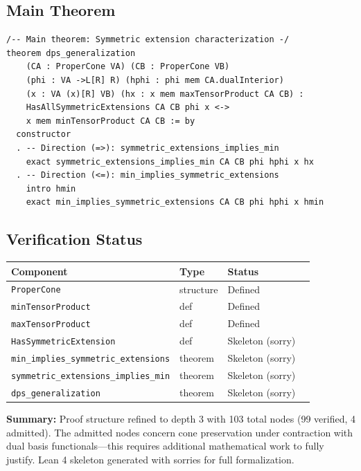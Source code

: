 \documentclass[11pt,a4paper]{article}
\theoremstyle{definition}
\theoremstyle{plain}
\begin{document}
\subsection{Main Theorem}

\begin{lstlisting}[firstnumber=85]
/-- Main theorem: Symmetric extension characterization -/
theorem dps_generalization
    (CA : ProperCone VA) (CB : ProperCone VB)
    (phi : VA ->L[R] R) (hphi : phi mem CA.dualInterior)
    (x : VA (x)[R] VB) (hx : x mem maxTensorProduct CA CB) :
    HasAllSymmetricExtensions CA CB phi x <->
    x mem minTensorProduct CA CB := by
  constructor
  . -- Direction (=>): symmetric_extensions_implies_min
    exact symmetric_extensions_implies_min CA CB phi hphi x hx
  . -- Direction (<=): min_implies_symmetric_extensions
    intro hmin
    exact min_implies_symmetric_extensions CA CB phi hphi x hmin
\end{lstlisting}

\subsection{Verification Status}

\begin{center}
\begin{tabular}{llll}
\toprule
\textbf{Component} & \textbf{Type} & \textbf{Status} \\
\midrule
\texttt{ProperCone} & structure & Defined \\
\texttt{minTensorProduct} & def & Defined \\
\texttt{maxTensorProduct} & def & Defined \\
\texttt{HasSymmetricExtension} & def & Skeleton (sorry) \\
\texttt{min\_implies\_symmetric\_extensions} & theorem & Skeleton (sorry) \\
\texttt{symmetric\_extensions\_implies\_min} & theorem & Skeleton (sorry) \\
\texttt{dps\_generalization} & theorem & Skeleton (sorry) \\
\bottomrule
\end{tabular}
\end{center}

\vspace{1em}
\textbf{Summary:} Proof structure refined to depth 3 with 103 total nodes (99 verified, 4 admitted). The admitted nodes concern cone preservation under contraction with dual basis functionals---this requires additional mathematical work to fully justify. Lean 4 skeleton generated with sorries for full formalization.
\end{document}
